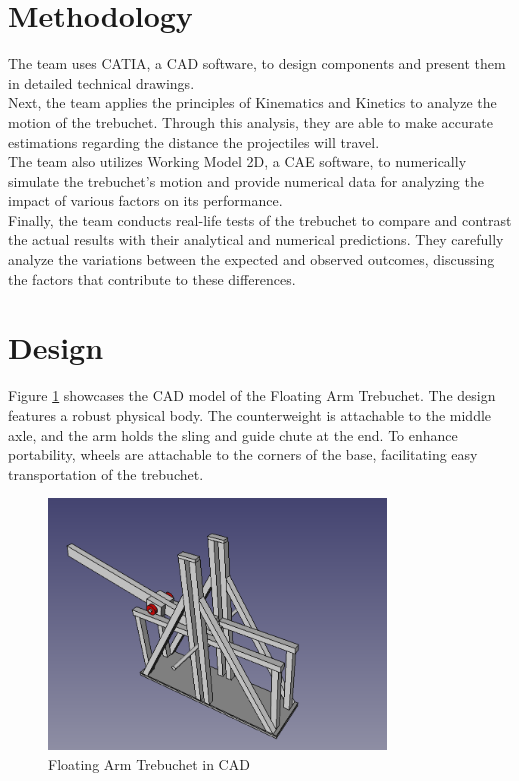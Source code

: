 \documentclass[12pt, titlepage]{article}
\begin{document}
    \section{Methodology}
    The team uses CATIA, a CAD software, to design components and present
    them in detailed technical drawings.\\[10pt] 
    Next, the team applies the principles of Kinematics and Kinetics to analyze the motion of the trebuchet. 
    Through this analysis, they are able to make accurate estimations regarding the distance the projectiles will travel.\\[10pt]
    The team also utilizes Working Model 2D, a CAE software, to numerically simulate the trebuchet's motion and provide numerical data for analyzing the impact of various factors on its performance.\\[10pt]
    Finally, the team conducts real-life tests of the trebuchet to compare and contrast the actual results with their analytical and numerical predictions. They carefully analyze the variations between the expected and observed outcomes, discussing the factors that contribute to these differences.    
    \newpage
    \section{Design}
    Figure \ref{CAD} showcases the CAD model of the Floating Arm Trebuchet. The design features a robust physical body. The counterweight is attachable to the middle axle, and the arm holds the sling and guide chute at the end. To enhance portability, wheels are attachable to the corners of the base, facilitating easy transportation of the trebuchet.\\
    \begin{figure}[t]                                  
    \centering
    \includegraphics[width=0.8\textwidth]{figures/CAD.png}
    \caption{Floating Arm Trebuchet in CAD\label{CAD}}
    \end{figure}
    \newpage
\end{document}
